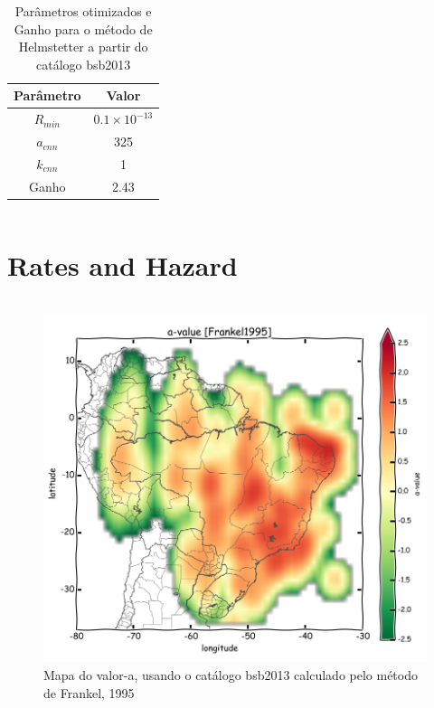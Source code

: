 \documentclass[final]{beamer}
\begin{document}
\begin{poster}
\begin{columns}[c,totalwidth=\textwidth]

\begin{table}[H]
	\centering
	\begin{tabular}{c|c}
		Parâmetro & Valor \\ \hline
		$R_{min}$ & $0.1\times10^{-13}$ \\
		$a_{cnn}$ & 325 \\
		$k_{cnn}$ & 1 \\ \hline
		Ganho	  & 2.43
	\end{tabular}
	\caption{Parâmetros otimizados e Ganho para o método de Helmstetter a partir do catálogo \gls{bsb2013}}
	\label{tab:hemlstetter}
\end{table}


\end{columns}


\vspace{0.3cm}
\section{Rates and Hazard}

\begin{columns}[t,totalwidth=\textwidth]



\begin{figure}[H]
  \centering
  \includegraphics[width=.98\textwidth]{a_frankel_br} 
  \caption{Mapa do valor-a, usando o catálogo \gls{bsb2013} calculado pelo método de Frankel, 1995 }
  \label{fig:a_fran_br} 
\end{figure}


\end{columns}
\end{poster}
\end{document}
